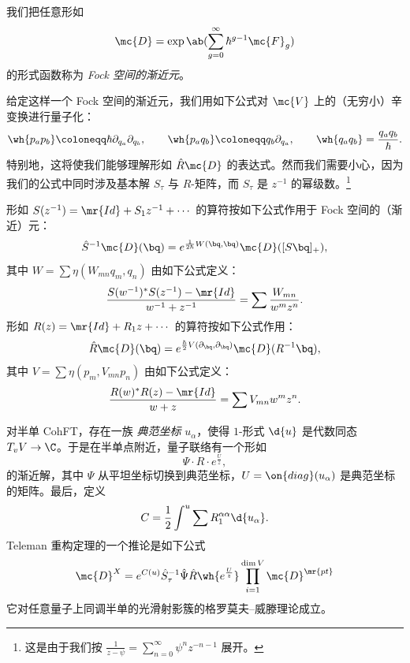 \begin{defn}
    我们把任意形如
    \[ \mc{D} = \exp\ab(\sum_{g=0}^{\infty} \hbar^{g-1} \mc{F}_g) \]
    的形式函数称为 \textit{Fock 空间的渐近元}。
\end{defn}

给定这样一个 Fock 空间的渐近元，我们用如下公式对 $\mc{V}$ 上的（无穷小）辛变换进行量子化：
\[ \wh{p_a p_b} \coloneqq \hbar \partial_{q_a} \partial_{q_b}, \qquad \wh{p_a q_b} \coloneqq q_b \partial_{q_a}, \qquad \wh{q_a q_b} = \frac{q_a q_b}{\hbar}. \]
特别地，这将使我们能够理解形如 $\hat{R} \mc{D}$ 的表达式。然而我们需要小心，因为我们的公式中同时涉及基本解 $S_{\tau}$ 与 $R$-矩阵，而 $S_{\tau}$ 是 $z^{-1}$ 的幂级数。\footnote{这是由于我们按 $\frac{1}{z-\psi} = \sum_{n=0}^{\infty} \psi^n z^{-n-1}$ 展开。}

\begin{thm}
    形如 $S(z^{-1}) = \mr{Id} + S_1 z^{-1} + \cdots$ 的算符按如下公式作用于 Fock 空间的（渐近）元：
    \[ \hat{S}^{-1} \mc{D}(\bq) = e^{\frac{1}{2\hbar}W(\bq,\bq)} \mc{D}([S \bq]_+), \]
    其中 $W = \sum \eta(W_{mn}q_m, q_n)$ 由如下公式定义：
    \[ \frac{S(w^{-1})^* S(z^{-1}) - \mr{Id}}{w^{-1}+z^{-1}} = \sum \frac{W_{mn}}{w^m z^n}. \]
    形如 $R(z) = \mr{Id} + R_1 z + \cdots$ 的算符按如下公式作用：
    \[ \hat{R}\mc{D}(\bq) = e^{\frac{\hbar}{2} V(\partial_{\bq}, \partial_{\bq})} \mc{D}(R^{-1} \bq), \]
    其中 $V = \sum \eta(p_m, V_{mn} p_n)$ 由如下公式定义：
    \[ \frac{R(w)^* R(z) - \mr{Id}}{w+z} = \sum V_{mn} w^m z^n. \]
\end{thm}

对半单 CohFT，存在一族 \textit{典范坐标} $u_{\alpha}$，使得 $1$-形式 $\d{u}$ 是代数同态 $T_v V \to \C$。于是在半单点附近，量子联络有一个形如
\[ \Psi \cdot  R \cdot e^{\frac{U}{z}}, \]
的渐近解，其中 $\Psi$ 从平坦坐标切换到典范坐标，$U = \on{diag}(u_{\alpha})$ 是典范坐标的矩阵。最后，定义
\[ C = \frac{1}{2} \int^u \sum R_1^{\alpha\alpha} \d{u_{\alpha}}. \]
Teleman 重构定理的一个推论是如下公式
\[ \mc{D}^X = e^{C(u)} \hat{S}^{-1}_{\tau} \hat{\Psi} \hat{R} \wh{e^{\frac{U}{z}}} \prod_{i=1}^{\dim V} \mc{D}^{\mr{pt}} \]
它对任意量子上同调半单的光滑射影簇的格罗莫夫–威滕理论成立。

